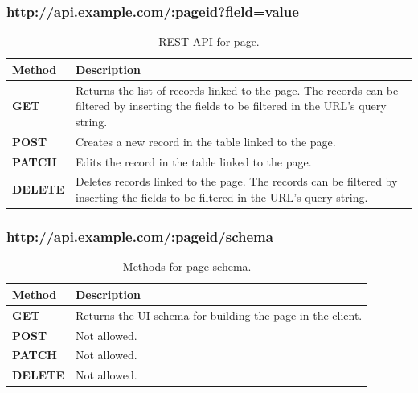 \subsubsection{http://api.example.com/:pageid?field=value}
\begin{table}
    \centering
    \begin{tabular}{|m{2cm}|m{10cm}|}
        \hline
        \textbf{Method} & \textbf{Description}                                                                                                        \\ \hline
        \textbf{GET}    &
        Returns the list of records linked to the page. The records can be filtered by inserting the fields to be filtered in the URL's query string. \\ \hline
        \textbf{POST}   &
        Creates a new record in the table linked to the page.                                                                                         \\ \hline
        \textbf{PATCH}  &
        Edits the record in the table linked to the page.                                                                                             \\ \hline
        \textbf{DELETE} &
        Deletes records linked to the page. The records can be filtered by inserting the fields to be filtered in the URL's query string.             \\ \hline
    \end{tabular}
    \caption{REST API for page.}
    \label{tab:api_rest_1}
\end{table}

\subsubsection{http://api.example.com/:pageid/schema}
\begin{table}
    \centering
    \begin{tabular}{|m{2cm}|m{10cm}|}
        \hline
        \textbf{Method} & \textbf{Description}                     \\ \hline
        \textbf{GET}    &
        Returns the UI schema for building the page in the client. \\ \hline
        \textbf{POST}   &
        Not allowed.                                               \\ \hline
        \textbf{PATCH}  &
        Not allowed.                                               \\ \hline
        \textbf{DELETE} &
        Not allowed.                                               \\ \hline
    \end{tabular}
    \caption{Methods for page schema.}
    \label{tab:api_rest_2}
\end{table}

